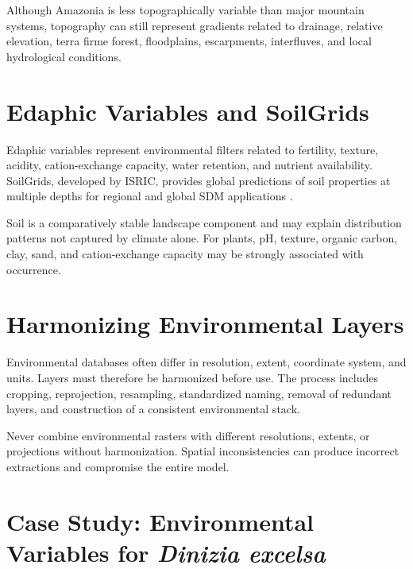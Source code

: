 Although Amazonia is less topographically variable than major mountain systems,
topography can still represent gradients related to drainage, relative
elevation, terra firme forest, floodplains, escarpments, interfluves, and local
hydrological conditions.

\section{Edaphic Variables and SoilGrids}

Edaphic variables represent environmental filters related to fertility,
texture, acidity, cation-exchange capacity, water retention, and nutrient
availability. SoilGrids, developed by ISRIC, provides global predictions of
soil properties at multiple depths for regional and global SDM applications
\parencite{poggio2021soilgrids}.

\begin{conceito}[title={\faBook\quad Soil as an ecological filter}]
Soil is a comparatively stable landscape component and may explain
distribution patterns not captured by climate alone. For plants, pH, texture,
organic carbon, clay, sand, and cation-exchange capacity may be strongly
associated with occurrence.
\end{conceito}

\section{Harmonizing Environmental Layers}

Environmental databases often differ in resolution, extent, coordinate system,
and units. Layers must therefore be harmonized before use. The process includes
cropping, reprojection, resampling, standardized naming, removal of redundant
layers, and construction of a consistent environmental stack.

\begin{atencao}[title={\faExclamationTriangle\quad Harmonize before modeling}]
Never combine environmental rasters with different resolutions, extents, or
projections without harmonization. Spatial inconsistencies can produce
incorrect extractions and compromise the entire model.
\end{atencao}

\section{Case Study: Environmental Variables for \textit{Dinizia excelsa}}

